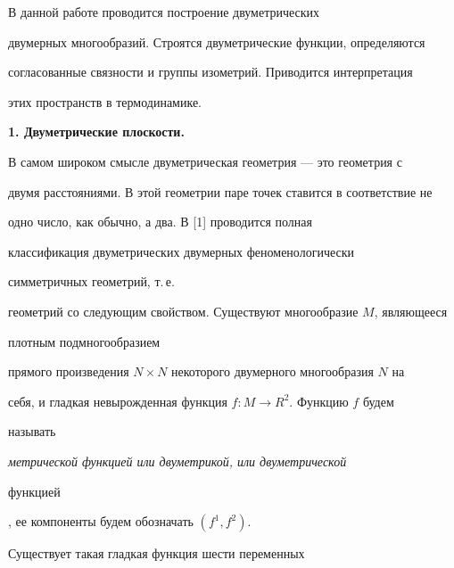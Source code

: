 \date{}




\pagestyle{plain} %







\maketitle


\label{begin}








В данной работе проводится построение двуметрических


двумерных многообразий. Строятся двуметрические функции, определяются


согласованные связности и группы изометрий. Приводится интерпретация


этих пространств в термодинамике.


\medskip








{\bf 1. Двуметрические плоскости.}


В самом широком смысле двуметрическая геометрия --- это геометрия с


двумя расстояниями. В этой геометрии паре точек ставится в соответствие не


одно число, как обычно, а два. В [1] проводится полная


классификация двуметрических двумерных феноменологически


симметричных геометрий, т.\,е.


геометрий со следующим свойством. Существуют многообразие $M$, являющееся


плотным подмногообразием


прямого произведения $N\times N$ некоторого двумерного многообразия $N$ на


себя, и гладкая невырожденная функция $f: M \to R^2$. Функцию $f$ будем


называть {\it метрической функцией или двуметрикой, или двуметрической


функцией}, ее компоненты будем обозначать $(f^1,f^2)$.


Существует такая гладкая функция шести переменных


